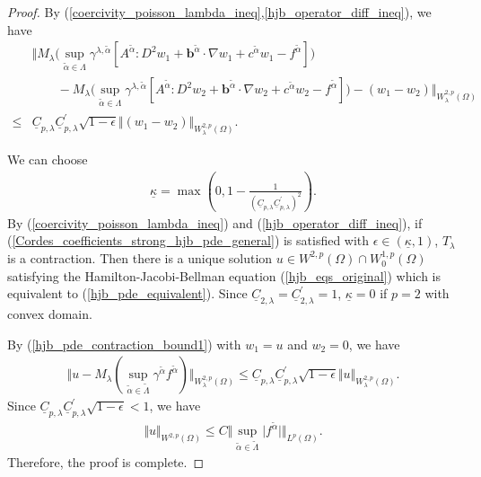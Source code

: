 \documentclass[12pt]{amsart}
\theoremstyle{definition}
\theoremstyle{remark}
\begin{document}
\begin{proof}
By (\ref{coercivity_poisson_lambda_ineq},\ref{hjb_operator_diff_ineq}), we have 
\begin{align}
\label{hjb_pde_contraction_bound1}
& \Vert M_{\lambda}\big(\sup_{\tilde{\alpha} \in 
\Lambda} \gamma^{\lambda,\tilde{\alpha}} [A^{\tilde{\alpha}}:D^{2}w_{1} 
+ \boldsymbol{b}^{\tilde{\alpha}}\cdot \nabla w_{1} 
+ c^{\tilde{\alpha}}w_{1} - f^{\tilde{\alpha}}]\big) \\
\nonumber
& \qquad - M_{\lambda}\big(\sup_{\tilde{\alpha} \in 
\Lambda} \gamma^{\lambda,\tilde{\alpha}} [A^{\tilde{\alpha}}:D^{2}w_{2} 
+ \boldsymbol{b}^{\tilde{\alpha}}\cdot \nabla w_{2} 
+ c^{\tilde{\alpha}}w_{2} - f^{\tilde{\alpha}}]\big) 
- (w_{1} - w_{2})\Vert_{W_{\lambda}^{2,p}(\Omega)} \\
\nonumber
\leq & \underline{C}_{p,\lambda}\underline{C}_{p,\lambda}^{\prime}
\sqrt{1 - \epsilon}\Vert (w_{1}-w_{2})\Vert_{W_{\lambda}^{2,p}(\Omega)}.
\end{align}

We can choose 
\begin{align}
\label{def_underline_kappa}
\underline{\kappa}= \max \left( 0, 1 - \frac{1}{(\underline{C}_{p,\lambda}
\underline{C}_{p,\lambda}^{\prime})^{2}} \right).
\end{align}  
By (\ref{coercivity_poisson_lambda_ineq}) and (\ref{hjb_operator_diff_ineq}), 
if (\ref{Cordes_coefficients_strong_hjb_pde_general}) is satisfied 
with $\epsilon \in (\underline{\kappa},1)$, $T_{\lambda}$ is a contraction. 
Then there is a unique solution $u\in W^{2,p}(\Omega)\cap W_{0}^{1,p}
(\Omega)$ satisfying the Hamilton-Jacobi-Bellman equation (\ref{hjb_eqs_original}) 
which is equivalent to (\ref{hjb_pde_equivalent}). 
Since $\underline{C}_{2,\lambda} = \underline{C}_{2,\lambda}^{\prime} = 1$, 
$\underline{\kappa} = 0$ if $p = 2$ with convex domain.

By (\ref{hjb_pde_contraction_bound1}) 
with $w_{1}=u$  and $w_{2}=0$, we have 
\begin{align*}
\Vert u - M_{\lambda}(\sup_{\tilde{\alpha}\in \tilde{\Lambda}}
\gamma^{\tilde{\alpha}}f^{\tilde{\alpha}}) \Vert_{W_{\lambda}^{2,p}(\Omega)} 
\leq \underline{C}_{p,\lambda}\underline{C}_{p,\lambda}^{\prime}
\sqrt{1 - \epsilon}\Vert u\Vert_{W_{\lambda}^{2,p}(\Omega)}.
\end{align*}
Since $\underline{C}_{p,\lambda}
\underline{C}_{p,\lambda}^{\prime}\sqrt{1-\epsilon}<1$, we have 
\begin{align*}
\Vert u\Vert_{W^{2,p}(\Omega)} \leq C \Vert \sup_{\tilde{\alpha}
\in \tilde{\Lambda}}\vert f^{\tilde{\alpha}}\vert\Vert_{L^{p}(\Omega)}.
\end{align*}
Therefore, the proof is complete.
\end{proof}
\end{document}
